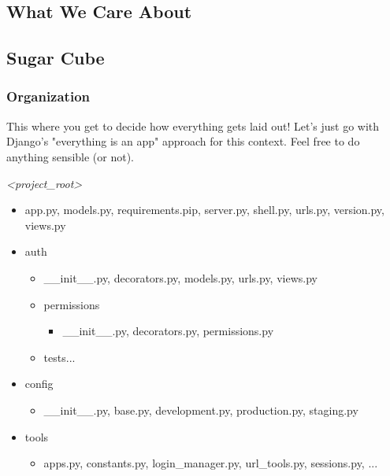 \documentclass{beamer}
\begin{document}
\subsection{What We Care About}

\subsection{Sugar Cube}
\begin{frame}
\frametitle{Organization}
\begin{block}{This where you get to decide how everything gets laid out!}
Let's just go with Django's "everything is an app" approach for this context. Feel free to do anything sensible (or not).
\end{block}
\tiny
\emph{\textless project\_root\textgreater}
\begin{itemize}
\item app.py, models.py, requirements.pip, server.py, shell.py, urls.py, version.py, views.py
\item auth
  \begin{itemize}
  \tiny
  \item \_\_init\_\_.py, decorators.py, models.py, urls.py, views.py
  \item permissions
    \begin{itemize}
    \tiny
    \item \_\_init\_\_.py, decorators.py, permissions.py
    \end{itemize}
  \item tests...
  \end{itemize}
  \tiny
\item config
  \begin{itemize}
  \tiny
  \item \_\_init\_\_.py, base.py, development.py, production.py, staging.py
  \end{itemize}
\item tools
  \begin{itemize}
  \tiny
  \item apps.py, constants.py, login\_manager.py, url\_tools.py, sessions.py, ...
  \end{itemize}
\end{itemize}
\normalsize
\end{frame}
\end{document}
